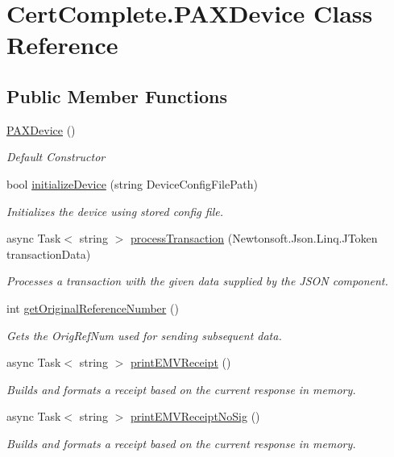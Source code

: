 \hypertarget{class_cert_complete_1_1_p_a_x_device}{}\section{Cert\+Complete.\+P\+A\+X\+Device Class Reference}
\label{class_cert_complete_1_1_p_a_x_device}
\subsection*{Public Member Functions}
\begin{DoxyCompactItemize}
\item 
\mbox{\hyperlink{class_cert_complete_1_1_p_a_x_device_aae9ac50b3ddf02d37aac79c78015d005}{P\+A\+X\+Device}} ()
\begin{DoxyCompactList}\small\item\em Default Constructor \end{DoxyCompactList}\item 
bool \mbox{\hyperlink{class_cert_complete_1_1_p_a_x_device_a3e48b4555be54f0e2a9c2b2434664cdf}{initialize\+Device}} (string Device\+Config\+File\+Path)
\begin{DoxyCompactList}\small\item\em Initializes the device using stored config file. \end{DoxyCompactList}\item 
async Task$<$ string $>$ \mbox{\hyperlink{class_cert_complete_1_1_p_a_x_device_a532c04c7e9cf54509efa3dd9a9692311}{process\+Transaction}} (Newtonsoft.\+Json.\+Linq.\+J\+Token transaction\+Data)
\begin{DoxyCompactList}\small\item\em Processes a transaction with the given data supplied by the J\+S\+ON component. \end{DoxyCompactList}\item 
int \mbox{\hyperlink{class_cert_complete_1_1_p_a_x_device_a6ae58cbf3aca1cbd8c00070343145f1b}{get\+Original\+Reference\+Number}} ()
\begin{DoxyCompactList}\small\item\em Gets the Orig\+Ref\+Num used for sending subsequent data. \end{DoxyCompactList}\item 
async Task$<$ string $>$ \mbox{\hyperlink{class_cert_complete_1_1_p_a_x_device_a3015c00ac78960de4f0bf54d45c76879}{print\+E\+M\+V\+Receipt}} ()
\begin{DoxyCompactList}\small\item\em Builds and formats a receipt based on the current response in memory. \end{DoxyCompactList}\item 
async Task$<$ string $>$ \mbox{\hyperlink{class_cert_complete_1_1_p_a_x_device_adc3aa4a5692d3b8dd61a15668b516546}{print\+E\+M\+V\+Receipt\+No\+Sig}} ()
\begin{DoxyCompactList}\small\item\em Builds and formats a receipt based on the current response in memory. \end{DoxyCompactList}\end{DoxyCompactItemize}
